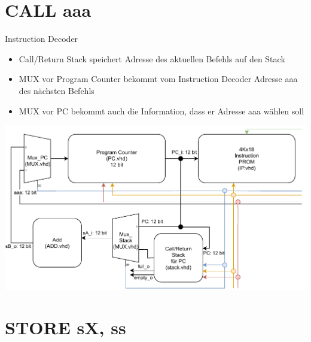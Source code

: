 \documentclass[10pt, t,
aspectratio=169,%
usenames,
dvipsnames,
]{beamer}
\begin{document}
	\section{CALL aaa}

	\begin{frame}{Instruction Decoder}
		\begin{multicols}{2}
		\begin{itemize}
			\item Call/Return Stack speichert Adresse des aktuellen Befehls auf den Stack
			\item MUX vor Program Counter bekommt vom Instruction Decoder Adresse aaa des nächsten Befehls
			\item MUX vor PC bekommt auch die Information, dass er Adresse aaa wählen soll
		\end{itemize}
		\includegraphics[width=\linewidth]{../Blockbeschreibungen/Stack-BlockdiagramSnipits.pdf}
		\end{multicols}
	\end{frame}

	\section{STORE sX, ss}
\end{document}
